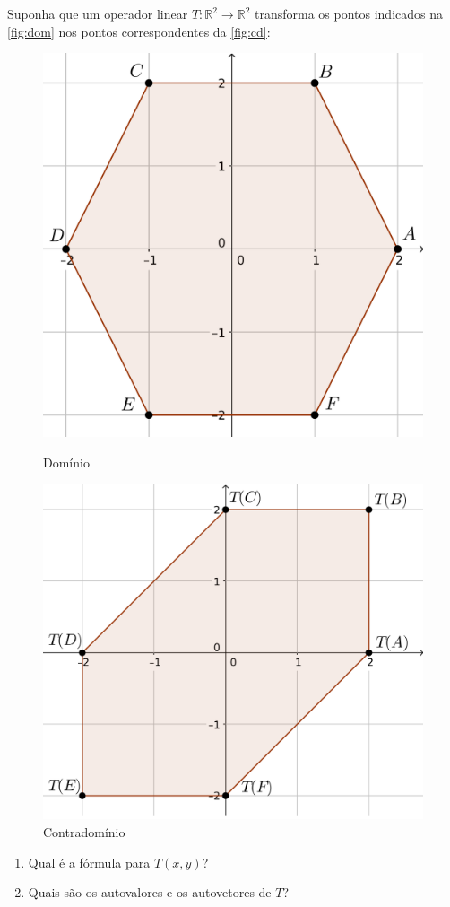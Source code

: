 \documentclass[12pt,a4paper]{article}
\newcommand{\fixme}{{\color{red}(...)}}
\newcommand*\R{\mathbb{R}}
\begin{document}
\begin{ExerciseList}

\Exercise[title={2,5}] Suponha que um operador linear $T: \R^2 \to \R^2$ transforma os pontos indicados na \autoref{fig:dom} nos pontos correspondentes da \autoref{fig:cd}:
\begin{figure}[h]
    \centering
    \begin{minipage}{0.45\textwidth}
        \centering
        \includegraphics[height=0.48\textwidth]{img/prova-4-nex-hexagono-dom}
        \caption{Domínio}\label{fig:dom}
    \end{minipage}\hfill
    \begin{minipage}{0.45\textwidth}
        \centering
        \includegraphics[height=0.48\textwidth]{img/prova-4-nex-hexagono-img}
        \caption{Contradomínio}\label{fig:cd}
    \end{minipage}
\end{figure}
\begin{enumerate}
\item Qual é a fórmula para $T(x,y)$?
\item Quais são os autovalores e os autovetores de $T$?
\end{enumerate}
\Answer \fixme


\end{ExerciseList}
\end{document}
